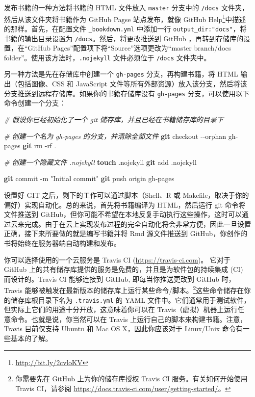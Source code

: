 \documentclass[
  12pt,
]{krantz}
\newenvironment{Shaded}{\begin{snugshade}}{\end{snugshade}}
\newcommand{\AttributeTok}[1]{\textcolor[rgb]{0.13,0.29,0.53}{#1}}
\newcommand{\CommentTok}[1]{\textcolor[rgb]{0.56,0.35,0.01}{\textit{#1}}}
\newcommand{\FunctionTok}[1]{\textcolor[rgb]{0.13,0.29,0.53}{\textbf{#1}}}
\newcommand{\NormalTok}[1]{#1}
\newcommand{\StringTok}[1]{\textcolor[rgb]{0.31,0.60,0.02}{#1}}
\renewcommand{\href}[2]{#2\footnote{\url{#1}}}
\theoremstyle{definition}
\theoremstyle{definition}
\theoremstyle{definition}
\theoremstyle{definition}
\theoremstyle{remark}
\begin{document}
发布书籍的一种方法将书籍的 HTML 文件放入 \texttt{master} 分支中的 \texttt{/docs} 文件夹，然后从该文件夹将书籍作为 GitHub Pagse 站点发布，就像 \href{http://bit.ly/2cvloKV}{GitHub Help}中描述的那样。首先，在配置文件 \texttt{\_bookdown.yml} 中添加一行 \texttt{output\_dir:"docs"}，将书籍的输出目录设置为 \texttt{/docs}。然后，将更改推送到 GitHub ，再转到存储库的设置，在``GitHub Pages''配置项下将``Source''选项更改为``master branch/docs folder''。使用该方法时，\texttt{.nojekyll} 文件必须位于 \texttt{/docs} 文件夹中。

另一种方法是先在存储库中创建一个 \texttt{gh-pages} 分支，再构建书籍，将 HTML 输出（包括图像、CSS 和 JavaScript 文件等所有外部资源）放入该分支，然后将该分支推送到远程存储库。如果你的书籍存储库没有 \texttt{gh-pages} 分支，可以使用以下命令创建一个分支：

\begin{Shaded}
\begin{Highlighting}[]
\CommentTok{\# 假设你已经初始化了一个 git 储存库，并且已经在书籍储存库的目录下}

\CommentTok{\# 创建一个名为 gh{-}pages 的分支，并清除全部文件}
\FunctionTok{git}\NormalTok{ checkout }\AttributeTok{{-}{-}orphan}\NormalTok{ gh{-}pages}
\FunctionTok{git}\NormalTok{ rm }\AttributeTok{{-}rf}\NormalTok{ .}

\CommentTok{\# 创建一个隐藏文件 .nojekyll}
\FunctionTok{touch}\NormalTok{ .nojekyll}
\FunctionTok{git}\NormalTok{ add .nojekyll}

\FunctionTok{git}\NormalTok{ commit }\AttributeTok{{-}m} \StringTok{"Initial commit"}
\FunctionTok{git}\NormalTok{ push origin gh{-}pages}
\end{Highlighting}
\end{Shaded}

设置好 GIT 之后，剩下的工作可以通过脚本（Shell、R 或 Makefile，取决于你的偏好）实现自动化。总的来说，首先将书籍编译为 HTML，然后运行 git 命令将文件推送到 GitHub，但你可能不希望在本地反复手动执行这些操作，这时可以通过云来完成。由于在云上实现发布过程的完全自动化将会非常方便，因此一旦设置正确，接下来所要做的就是编写书籍并将 Rmd 源文件推送到 GitHub，你创作的书将始终在服务器端自动构建和发布。

你可以选择使用的一个云服务是 Travis CI (\url{https://travis-ci.com})。 它对于 GitHub 上的共有储存库提供的服务是免费的，并且是为软件包的持续集成 (CI) 而设计的。Travis CI 能够连接到 GitHub, 即每当你推送更改到 GitHub 时，Travis 能够被触发在最新版本的储存库上运行某些命令/脚本。\footnote{你需要先在 GitHub 上为你的储存库授权 Travis CI 服务。有关如何开始使用 Travis CI，请参阅 \url{https://docs.travis-ci.com/user/getting-started/}。}这些命令储存在你的储存库根目录下名为 \texttt{.travis.yml} 的 YAML 文件中。它们通常用于测试软件，但实际上它们的用途十分开放，这意味着你可以在 Travis（虚拟）机器上运行任意命令。也就是说，你当然可以在 Travis 上运行自己的脚本来构建书籍。注意，Travis 目前仅支持 Ubuntu 和 Mac OS X，因此你应该对于 Linux/Unix 命令有一些基本的了解。
\end{document}
